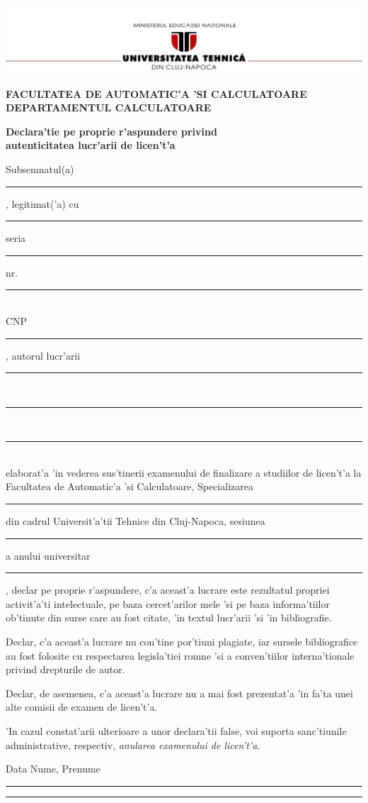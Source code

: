 \documentclass[12pt,a4paper,twoside]{report}
\newcommand{\department}{FACULTATEA DE AUTOMATIC'A 'SI CALCULATOARE\\
DEPARTAMENTUL CALCULATOARE}
\newcommand{\uline}[1]{\rule[0pt]{#1}{0.4pt}}
\newcommand{\utcnlogo}{\includegraphics[width=15cm]{img/utcn.jpg}}
\begin{document}
\begin{center}
\utcnlogo

{\bf \department}
\end{center}

\vspace{0.5cm}

\begin{center}
{\bf
Declara'tie pe proprie r'aspundere privind\\ 
autenticitatea lucr'arii de licen't'a}
\end{center}
\vspace{1cm}



Subsemnatul(a) \\
\uline{14.8cm}, 
legitimat('a) cu \uline{4cm} seria \uline{3cm} nr. \uline{4cm}\\
CNP \uline{9cm}, autorul lucr'arii \uline{2.8cm}\\
\uline{16cm}\\
\uline{16cm}\\
elaborat'a 'in vederea sus'tinerii examenului de finalizare a studiilor de licen't'a la Facultatea de Automatic'a 'si Calculatoare, Specializarea \uline{7cm} din cadrul Universit'a'tii Tehnice din Cluj-Napoca, sesiunea \uline{4cm} a anului universitar \uline{3cm}, declar pe proprie r'aspundere, c'a aceast'a lucrare este rezultatul propriei activit'a'ti intelectuale, pe baza cercet'arilor mele 'si pe baza informa'tiilor ob'tinute din surse care au fost citate, 'in textul lucr'arii 'si 'in bibliografie.

Declar, c'a aceast'a lucrare nu con'tine por'tiuni plagiate, iar sursele bibliografice au fost folosite cu respectarea legisla'tiei rom\ia ne 'si a conven'tiilor interna'tionale privind drepturile de autor.

Declar, de asemenea, c'a aceast'a lucrare nu a mai fost prezentat'a 'in fa'ta unei alte comisii de examen de licen't'a.

'In cazul constat'arii ulterioare a unor declara'tii false, voi suporta sanc'tiunile administrative, respectiv, \emph{anularea examenului de licen't'a}.

\vspace{1.5cm}

Data \hspace{8cm} Nume, Prenume

\vspace{0.5cm}

\uline{3cm} \hspace{5cm} \uline{5cm}
\end{document}
